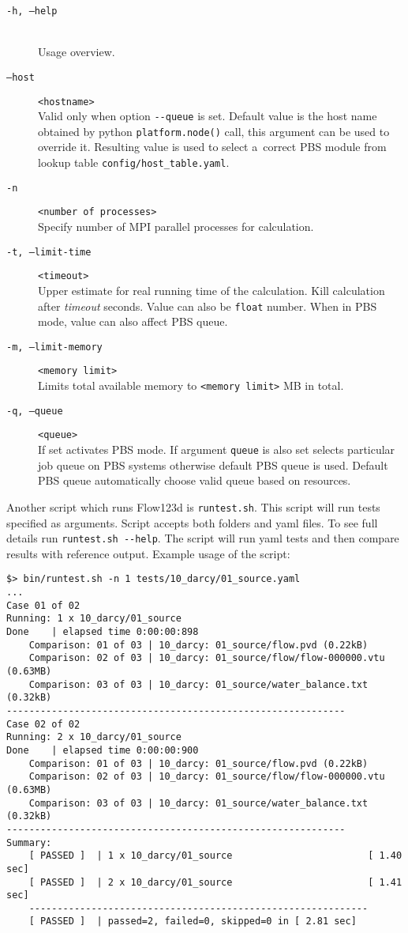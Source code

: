 \begin{description}
  \item[{\tt -h, --help}] \hfill\\
  	Usage overview.
  \item[{\tt --host}] \verb'<hostname>' \hfill\\
  		Valid only when option \verb'--queue' is set.
        Default value is the host name obtained by python \verb'platform.node()' call, this argument can be used to override it.
        Resulting value is used to select a~correct PBS module from lookup table \verb'config/host_table.yaml'.
  \item[{\tt -n}] \verb'<number of processes>' \hfill\\
  	Specify number of MPI parallel processes for calculation.
  \item[{\tt -t, --limit-time}] \verb'<timeout>' \hfill\\
  	Upper estimate for real running time of the calculation. Kill calculation after {\it timeout} seconds.
  	Value can also be \verb'float' number. When in PBS mode, value can also affect PBS queue.
  \item[{\tt -m, --limit-memory}] \verb'<memory limit>' \hfill\\
  	Limits total available memory to \verb'<memory limit>' MB in total.
  \item[{\tt -q, --queue}] \verb'<queue>' \hfill\\
  		If set activates PBS mode. If argument \verb'queue' is also set selects particular job queue
  		on PBS systems otherwise default PBS queue is used. Default PBS queue automatically
  		choose valid queue based on resources.
\end{description}


Another script which runs Flow123d is \verb'runtest.sh'. This script will run tests specified as arguments. Script accepts both folders
and yaml files. To see full details run \verb'runtest.sh --help'. The script will run yaml tests and then compare results with reference
output. Example usage of the script:

\begin{verbatim}
$> bin/runtest.sh -n 1 tests/10_darcy/01_source.yaml
...
Case 01 of 02
Running: 1 x 10_darcy/01_source
Done    | elapsed time 0:00:00:898
    Comparison: 01 of 03 | 10_darcy: 01_source/flow.pvd (0.22kB)
    Comparison: 02 of 03 | 10_darcy: 01_source/flow/flow-000000.vtu (0.63MB)
    Comparison: 03 of 03 | 10_darcy: 01_source/water_balance.txt (0.32kB)
------------------------------------------------------------
Case 02 of 02
Running: 2 x 10_darcy/01_source
Done    | elapsed time 0:00:00:900
    Comparison: 01 of 03 | 10_darcy: 01_source/flow.pvd (0.22kB)
    Comparison: 02 of 03 | 10_darcy: 01_source/flow/flow-000000.vtu (0.63MB)
    Comparison: 03 of 03 | 10_darcy: 01_source/water_balance.txt (0.32kB)
------------------------------------------------------------
Summary:
    [ PASSED ]  | 1 x 10_darcy/01_source                        [ 1.40 sec]
    [ PASSED ]  | 2 x 10_darcy/01_source                        [ 1.41 sec]
    ------------------------------------------------------------
    [ PASSED ]  | passed=2, failed=0, skipped=0 in [ 2.81 sec]

\end{verbatim}
